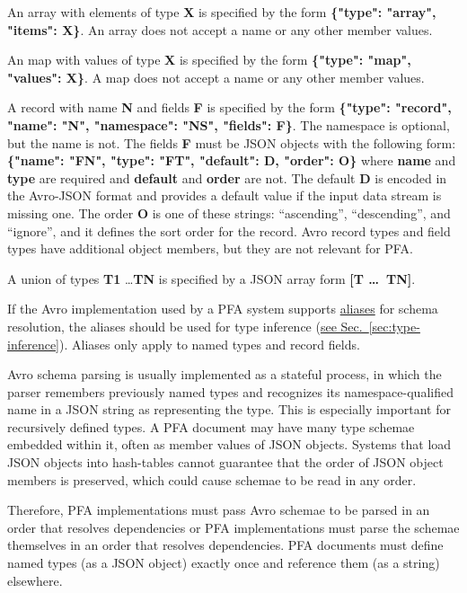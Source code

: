 \documentclass{article}
\newcommand{\PFAc}{\ttfamily\bfseries}
\newcommand{\PFAtp}{\ttfamily\bfseries}
\theoremstyle{definition}
\begin{document}
An array with elements of type {\PFAtp X} is specified by the form {\PFAc \{"type": "array", "items": X\}}.  An array does not accept a name or any other member values.

An map with values of type {\PFAtp X} is specified by the form {\PFAc \{"type": "map", "values": X\}}.  A map does not accept a name or any other member values.

A record with name {\PFAtp N} and fields {\PFAtp F} is specified by the form {\PFAc \{"type":$\!$ "record", "name":$\!$ "N", "namespace":$\!$ "NS", "fields":$\!$ F\}}.  The namespace is optional, but the name is not.  The fields {\PFAtp F} must be JSON objects with the following form: {\PFAc \{"name": "FN", "type": "FT", "default": D, "order": O\}} where {\PFAc name} and {\PFAc type} are required and {\PFAc default} and {\PFAc order} are not.  The default {\PFAtp D} is encoded in the Avro-JSON format and provides a default value if the input data stream is missing one.  The order {\PFAc O} is one of these strings: ``ascending'', ``descending'', and ``ignore'', and it defines the sort order for the record.  Avro record types and field types have additional object members, but they are not relevant for PFA.

A union of types {\PFAtp T1} \ldots {\PFAtp TN} is specified by a JSON array form {\PFAc [T \ldots\ TN]}.

If the Avro implementation used by a PFA system supports \href{http://avro.apache.org/docs/1.7.6/spec.html#Aliases}{aliases} for schema resolution, the aliases should be used for type inference (\hyperlink{hsec:type-inference}{see Sec.~\ref{sec:type-inference}}).  Aliases only apply to named types and record fields.

Avro schema parsing is usually implemented as a stateful process, in which the parser remembers previously named types and recognizes its namespace-qualified name in a JSON string as representing the type.  This is especially important for recursively defined types.  A PFA document may have many type schemae embedded within it, often as member values of JSON objects.  Systems that load JSON objects into hash-tables cannot guarantee that the order of JSON object members is preserved, which could cause schemae to be read in any order.

Therefore, PFA implementations must pass Avro schemae to be parsed in an order that resolves dependencies or PFA implementations must parse the schemae themselves in an order that resolves dependencies.  PFA documents must define named types (as a JSON object) exactly once and reference them (as a string) elsewhere.
\end{document}
